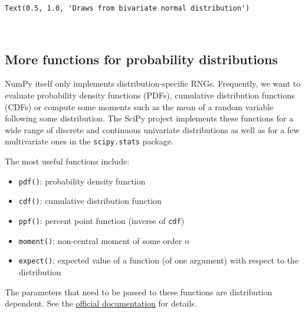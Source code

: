 \documentclass{scrartcl}
\makeatletter
\providecommand{\tightlist}{%
      \setlength{\itemsep}{0pt}\setlength{\parskip}{0pt}}
\newcommand{\boxspacing}{\kern\kvtcb@left@rule\kern\kvtcb@boxsep}
\newcommand{\prompt}[4]{
        {\ttfamily\llap{{\color{#2}[#3]:\hspace{3pt}#4}}\vspace{-\baselineskip}}
    }
\makeatother
\begin{document}
            \begin{tcolorbox}[breakable, size=fbox, boxrule=.5pt, pad at break*=1mm, opacityfill=0]
\prompt{Out}{outcolor}{13}{\boxspacing}
\begin{Verbatim}[commandchars=\\\{\}]
Text(0.5, 1.0, 'Draws from bivariate normal distribution')
\end{Verbatim}
\end{tcolorbox}
        
    \begin{center}
    \end{center}
    { \hspace*{\fill} \\}
    

\hypertarget{more-functions-for-probability-distributions}{%
\subsection{More functions for probability
distributions}\label{more-functions-for-probability-distributions}}

NumPy itself only implements distribution-specific RNGs. Frequently, we
want to evaluate probability density functions (PDFs), cumulative
distribution functions (CDFs) or compute some moments such as the mean
of a random variable following some distribution. The SciPy project
implements these functions for a wide range of discrete and continuous
univariate distributions as well as for a few multivariate ones in the
\texttt{scipy.stats} package.

The most useful functions include:

\begin{itemize}
\tightlist
\item
  \texttt{pdf()}: probability density function
\item
  \texttt{cdf()}: cumulative distribution function
\item
  \texttt{ppf()}: percent point function (inverse of \texttt{cdf})
\item
  \texttt{moment()}: non-central moment of some order \(n\)
\item
  \texttt{expect()}: expected value of a function (of one argument) with
  respect to the distribution
\end{itemize}

The parameters that need to be passed to these functions are
distribution dependent. See the
\href{https://docs.scipy.org/doc/scipy/reference/stats.html}{official
documentation} for details.
\end{document}
